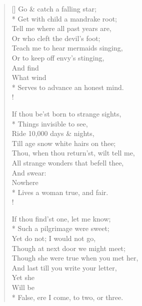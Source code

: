 \documentclass[MAIN]{subfiles}
\begin{document}
\settowidth{\versewidth}{Teach me to hear mermaids singing,}
\begin{verse}[\versewidth]
Go \& catch a falling star;\\*
\vin Get with child a mandrake root;\\
Tell me where all past years are,\\
\vin Or who cleft the devil's foot;\\
Teach me to hear mermaids singing,\\
Or to keep off envy's stinging,\\
\vin \vin And find\\
\vin \vin What wind\\*
Serves to advance an honest mind.\\!

If thou be'st born to strange sights,\\*
\vin Things invisible to see,\\
Ride 10,000 days \& nights,\\
\vin Till age snow white hairs on thee;\\
Thou, when thou return'st, wilt tell me,\\
All strange wonders that befell thee,\\
\vin \vin And swear:\\
\vin \vin Nowhere\\*
Lives a woman true, and fair.\\!

If thou find'st one, let me know;\\*
\vin Such a pilgrimage were sweet;\\
Yet do not; I would not go,\\
\vin Though at next door we might meet;\\
Though she were true when you met her,\\
And last till you write your letter,\\
\vin \vin Yet she\\
\vin \vin Will be\\*
False, ere I come, to two, or three.
\end{verse}
\end{document}
